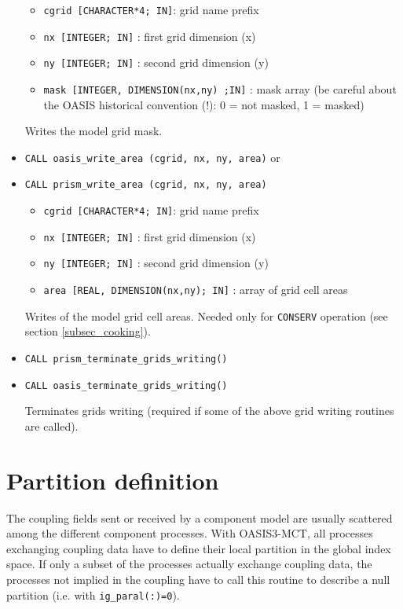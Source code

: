 \begin{itemize}
 \begin{itemize}
    \item {\tt cgrid [CHARACTER*4; IN]}: grid name prefix 
    \item {\tt nx [INTEGER; IN]} : first grid dimension (x)
    \item {\tt ny [INTEGER; IN]} : second grid dimension (y)
    \item {\tt mask [INTEGER, DIMENSION(nx,ny) ;IN]} : mask array (be
      careful about the OASIS historical convention (!): 0 = not masked, 1 = masked)
 \end{itemize}
Writes the model grid mask.

\vspace{0.2cm}
\item {\tt CALL oasis\_write\_area (cgrid, nx, ny, area)} or
\item {\tt CALL prism\_write\_area (cgrid, nx, ny, area)}

 \begin{itemize}
    \item {\tt cgrid [CHARACTER*4; IN]}: grid name prefix
    \item {\tt nx [INTEGER; IN]} : first grid dimension (x)
    \item {\tt ny [INTEGER; IN]} : second grid dimension (y)
    \item {\tt area [REAL, DIMENSION(nx,ny); IN]} : array of grid cell areas
 \end{itemize}
Writes of the model grid cell areas. Needed only for {\tt CONSERV}
operation (see section \ref{subsec_cooking}).

\vspace{0.2cm}
\item {\tt CALL prism\_terminate\_grids\_writing()}
\item {\tt CALL oasis\_terminate\_grids\_writing()}

Terminates grids writing (required if some of the above grid writing
routines are called).

\end{itemize}

\section{Partition definition}
\label{subsubsec_Partition}


The coupling fields sent or received by a component model are usually
scattered among the different component processes. With OASIS3-MCT,
all processes exchanging coupling data have to define their local
partition in the global index space. If only a subset of the processes
actually exchange coupling data, the processes not implied in the
coupling have to call this routine to describe a null partition (i.e. with {\tt ig\_paral(:)=0}).

